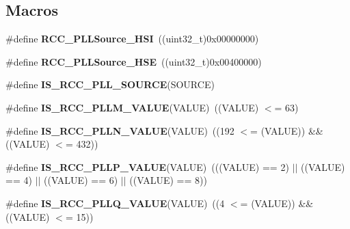 \subsection*{Macros}
\begin{DoxyCompactItemize}
\item 
\mbox{\label{group___r_c_c___p_l_l___clock___source_ga1cbb1ae8d9e282a763a0070b251921f9}} 
\#define {\bfseries R\+C\+C\+\_\+\+P\+L\+L\+Source\+\_\+\+H\+SI}~((uint32\+\_\+t)0x00000000)
\item 
\mbox{\label{group___r_c_c___p_l_l___clock___source_ga3706d0db7fe1836c65dc2ea7deded721}} 
\#define {\bfseries R\+C\+C\+\_\+\+P\+L\+L\+Source\+\_\+\+H\+SE}~((uint32\+\_\+t)0x00400000)
\item 
\#define {\bfseries I\+S\+\_\+\+R\+C\+C\+\_\+\+P\+L\+L\+\_\+\+S\+O\+U\+R\+CE}(S\+O\+U\+R\+CE)
\item 
\mbox{\label{group___r_c_c___p_l_l___clock___source_ga8db327c085e20aeb673a9784f8508597}} 
\#define {\bfseries I\+S\+\_\+\+R\+C\+C\+\_\+\+P\+L\+L\+M\+\_\+\+V\+A\+L\+UE}(V\+A\+L\+UE)~((V\+A\+L\+UE) $<$= 63)
\item 
\mbox{\label{group___r_c_c___p_l_l___clock___source_ga12835741fbedd278ad1e91abebe00837}} 
\#define {\bfseries I\+S\+\_\+\+R\+C\+C\+\_\+\+P\+L\+L\+N\+\_\+\+V\+A\+L\+UE}(V\+A\+L\+UE)~((192 $<$= (V\+A\+L\+UE)) \&\& ((V\+A\+L\+UE) $<$= 432))
\item 
\mbox{\label{group___r_c_c___p_l_l___clock___source_gad808f83505f4e802e5bafab7831f0235}} 
\#define {\bfseries I\+S\+\_\+\+R\+C\+C\+\_\+\+P\+L\+L\+P\+\_\+\+V\+A\+L\+UE}(V\+A\+L\+UE)~(((V\+A\+L\+UE) == 2) $\vert$$\vert$ ((V\+A\+L\+UE) == 4) $\vert$$\vert$ ((V\+A\+L\+UE) == 6) $\vert$$\vert$ ((V\+A\+L\+UE) == 8))
\item 
\mbox{\label{group___r_c_c___p_l_l___clock___source_gad66dbe75bf8ab2b64b200e796281a851}} 
\#define {\bfseries I\+S\+\_\+\+R\+C\+C\+\_\+\+P\+L\+L\+Q\+\_\+\+V\+A\+L\+UE}(V\+A\+L\+UE)~((4 $<$= (V\+A\+L\+UE)) \&\& ((V\+A\+L\+UE) $<$= 15))
\item 
\mbox{\label{group___r_c_c___p_l_l___clock___source_gac30fb7f6fe9f22a7d6c5585909db5c3c}} 
$$
\end{DoxyCompactItemize}
